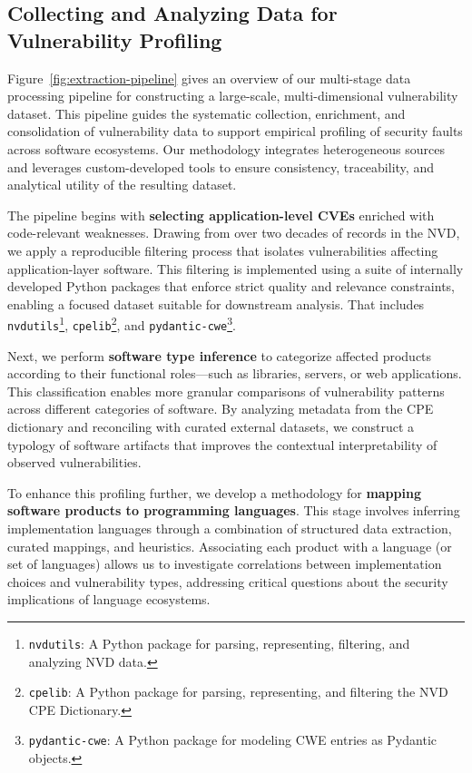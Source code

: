 \subsection{Collecting and Analyzing Data for Vulnerability Profiling} 

Figure~\ref{fig:extraction-pipeline} gives an overview of our multi-stage data processing pipeline for constructing a large-scale, multi-dimensional vulnerability dataset. This pipeline guides the systematic collection, enrichment, and consolidation of vulnerability data to support empirical profiling of security faults across software ecosystems. Our methodology integrates heterogeneous sources and leverages custom-developed tools to ensure consistency, traceability, and analytical utility of the resulting dataset.

The pipeline begins with \textbf{selecting application-level \ac{CVE}s} enriched with code-relevant weaknesses. Drawing from over two decades of records in the \ac{NVD}, we apply a reproducible filtering process that isolates vulnerabilities affecting application-layer software. This filtering is implemented using a suite of internally developed Python packages that enforce strict quality and relevance constraints, enabling a focused dataset suitable for downstream analysis. That includes \texttt{nvdutils}\footnote{\texttt{nvdutils}: A Python package for parsing, representing, filtering, and analyzing NVD data.}, \texttt{cpelib}\footnote{\texttt{cpelib}: A Python package for parsing, representing, and filtering the NVD \ac{CPE} Dictionary.}, and \texttt{pydantic-cwe}\footnote{\texttt{pydantic-cwe}: A Python package for modeling \ac{CWE} entries as Pydantic objects.}. 

Next, we perform \textbf{software type inference} to categorize affected products according to their functional roles—such as libraries, servers, or web applications. This classification enables more granular comparisons of vulnerability patterns across different categories of software. By analyzing metadata from the CPE dictionary and reconciling with curated external datasets, we construct a typology of software artifacts that improves the contextual interpretability of observed vulnerabilities.

To enhance this profiling further, we develop a methodology for \textbf{mapping software products to programming languages}. This stage involves inferring implementation languages through a combination of structured data extraction, curated mappings, and heuristics. Associating each product with a language (or set of languages) allows us to investigate correlations between implementation choices and vulnerability types, addressing critical questions about the security implications of language ecosystems.

